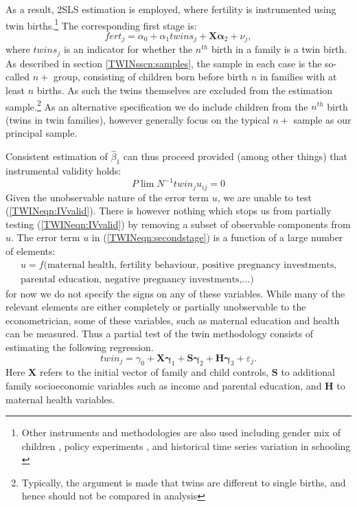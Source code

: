 As a result, 2SLS estimation is employed, where fertility is instrumented using
twin births.\footnote{Other instruments and methodologies are also used 
including gender mix of children \citep{Angristetal2010}, policy experiments 
\citep{Qian2009}, and historical time series variation in schooling 
\citep{BleakleyLange2009}}  The corresponding first stage is:
\begin{equation}
\label{TWINeqn:firststage}
fert_{j}=\alpha_0+\alpha_1 twins_{j}+\bm{X}\bm{\alpha}_2+\nu_{j},
\end{equation}
where $twins_j$ is an indicator for whether the $n^{th}$ birth in a family is a 
twin birth. As described in section \ref{TWINsscn:samples}, the sample in each 
case is the so-called $n+$ group, consisting of children born before birth $n$ 
in families with at least $n$ births.  As such the twins themselves are excluded 
from the estimation sample.\footnote{Typically, the argument is made that twins 
are different to single births, and hence should not be compared in analysis}
As an alternative specification we do include children from the $n^{th}$ birth 
(twins in twin families), however generally focus on the typical $n+$ sample as
our principal sample.

Consistent estimation of $\hat\beta_1$ can thus proceed provided (among other
things) that instrumental validity holds:
\begin{equation}
\label{TWINeqn:IVvalid}
P\lim N^{-1}twin_ju_{ij}=0 
\end{equation}
Given the unobservable nature of the error term $u$, we are unable to test 
(\ref{TWINeqn:IVvalid}).  There is however nothing which stops us from 
partially testing (\ref{TWINeqn:IVvalid}) by removing a subset of observable
components from $u$.  The error term $u$ in (\ref{TWINeqn:secondstage}) is a 
function of a large number of elements:
\begin{equation}
\label{TWINeqn:IVbias}
\begin{split}
u=f(\text{maternal health, fertility behaviour, positive pregnancy investments,}  \\
\text{parental education, negative pregnancy investments,}\ldots)
\end{split}
\end{equation}
for now we do not specify the signs on any of these variables.  While many of 
the relevant elements are either completely or partially unobservable to the 
econometrician, some of these variables, such as maternal education and health
can be measured.  Thus a partial test of the twin methodology consists of 
estimating the following regression.
\begin{equation}
\label{TWINeqn:twinreg}
twin_{j}=\gamma_0 + \bm{X}\bm{\gamma}_1 + \bm{S}\bm{\gamma}_2
                  + \bm{H}\bm{\gamma}_3 + \varepsilon_{j}.
\end{equation}
Here $\bm{X}$ refers to the initial vector of family and child controls, $\bm{S}$
to additional family socioeconomic variables such as income and parental 
education, and $\bm{H}$ to maternal health variables.  

